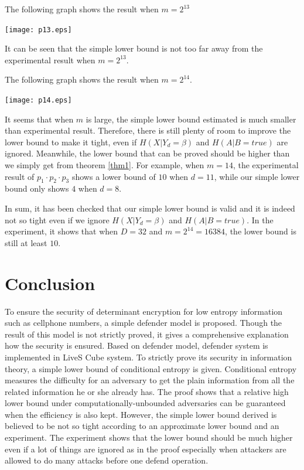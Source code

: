 \documentclass[10pt,a4paper]{article}
\begin{document}
		The following graph shows the result when $m = 2^{13}$
		\begin{center}
			\texttt{[image: p13.eps]}
		\end{center}
		It can be seen that the simple lower bound is not too
		far away from the experimental result when $m = 2^{13}$.
		
		The following graph shows the result when $m = 2^{14}$.
		\begin{center}
			\texttt{[image: p14.eps]}
		\end{center}
		It seems that when $m$ is large, the simple lower bound
		estimated is much smaller than experimental result. Therefore,
		there is still plenty of room to improve the lower bound
		to make it tight, even if $H(X | Y_d = \beta)$ and $H(A | B = true)$ 
		are ignored. Meanwhile, the lower bound that can be proved should
		be higher than we simply get from theorem \ref{thm1}.
		For example, when $m = 14$, the experimental result
		of $p_1 \cdot p_2 \cdot p_3$ shows a lower bound of $10$
		when $d = 11$, while our simple lower bound only shows $4$
		when $d = 8$.
		
		In sum, it has been checked that our simple lower bound
		is valid and it is indeed not so tight even if we ignore
		$H(X | Y_d = \beta)$ and $H(A | B = true)$. In the experiment,
		it shows that when $D = 32$ and $m = 2^{14} = 16384$, the lower bound
		is still at least $10$.

\section{Conclusion}
	To ensure the security of determinant encryption
	for low entropy information such as cellphone numbers,
	a simple defender model is proposed. Though the result
	of this model is not strictly proved, it gives a comprehensive
	explanation how the security is ensured.
	Based on defender model, defender system is implemented in LiveS Cube
	system. To strictly prove its security in information theory,
	a simple lower bound of conditional entropy is given.
	Conditional entropy measures the difficulty for an adversary
	to get the plain information from all the related information
	he or she already has.
	The proof shows that a relative high lower bound
	under computationally-unbounded adversaries can be guaranteed
	when the efficiency is also kept.
	However, the simple lower bound derived
	is believed to be not so tight according to an approximate lower bound 
	and an experiment. The experiment shows that the lower bound
	should be much higher even if a lot of things are ignored as
	in the proof especially when attackers are allowed to do many
	attacks before one defend operation.
	
\end{document}
